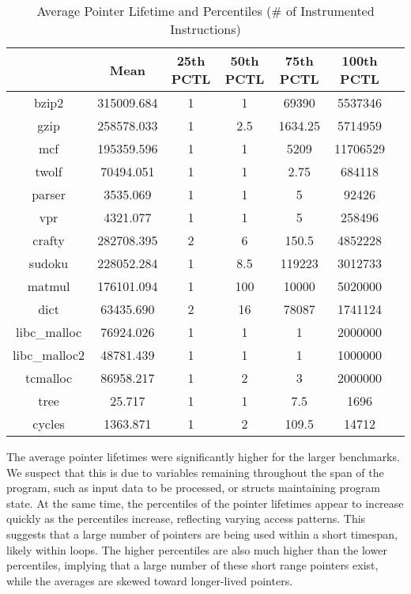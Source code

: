 \begin{table} [h!]
\centering
   \begin{tabular} {|c|c c c c c c|}
      \hline
	   & Mean & 25th PCTL & 50th PCTL & 75th PCTL & 100th PCTL \\
      \hline
	   bzip2 & 315009.684 & 1 & 1 & 69390 & 5537346 \\
      \hline
	   gzip & 258578.033 & 1 & 2.5 & 1634.25 & 5714959 \\
      \hline
	   mcf & 195359.596 & 1 & 1 & 5209 & 11706529 \\
      \hline
	   twolf & 70494.051 & 1 & 1 & 2.75 & 684118 \\
      \hline
	   parser & 3535.069 & 1 & 1 & 5 & 92426 \\
      \hline
	   vpr & 4321.077 & 1 & 1 & 5 & 258496 \\
      \hline
	   crafty & 282708.395 & 2 & 6 & 150.5 & 4852228 \\
      \hline
	   sudoku & 228052.284 & 1 & 8.5 & 119223 & 3012733 \\
      \hline
	   matmul & 176101.094 & 1 & 100 & 10000 & 5020000 \\
      \hline
	   dict & 63435.690 & 2 & 16 & 78087 & 1741124 \\
      \hline
	   libc\_malloc & 76924.026 & 1 & 1 & 1 & 2000000 \\
      \hline
	   libc\_malloc2 & 48781.439 & 1 & 1 & 1 & 1000000 \\
      \hline
	   tcmalloc & 86958.217 & 1 & 2 & 3 & 2000000 \\
      \hline
	   tree & 25.717 & 1 & 1 & 7.5 & 1696 \\
      \hline
	   cycles & 1363.871 & 1 & 2 & 109.5 & 14712 \\
      \hline
   \end{tabular}
   \caption{Average Pointer Lifetime and Percentiles (# of Instrumented Instructions)}
   \label{table:4}
\end{table}

The average pointer lifetimes were significantly higher for the larger benchmarks. We suspect that this is due to variables remaining throughout the span of the program, such as input data to be processed, or structs maintaining program state. At the same time, the percentiles of the pointer lifetimes appear to increase quickly as the percentiles increase, reflecting varying access patterns. This suggests that a large number of pointers are being used within a short timespan, likely within loops. The higher percentiles are also much higher than the lower percentiles, implying that a large number of these short range pointers exist, while the averages are skewed toward longer-lived pointers.

